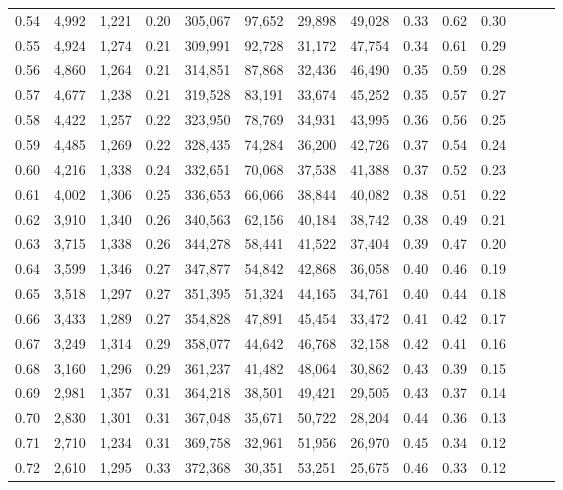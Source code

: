 \begin{tabular}{rrrrrrrrrrrrrr}
0.54 &  4,992 &  1,221 &  0.20 &  305,067 &   97,652 &  29,898 &  49,028 &  0.33 &  0.62 &      0.30 \\
0.55 &  4,924 &  1,274 &  0.21 &  309,991 &   92,728 &  31,172 &  47,754 &  0.34 &  0.61 &      0.29 \\
0.56 &  4,860 &  1,264 &  0.21 &  314,851 &   87,868 &  32,436 &  46,490 &  0.35 &  0.59 &      0.28 \\
0.57 &  4,677 &  1,238 &  0.21 &  319,528 &   83,191 &  33,674 &  45,252 &  0.35 &  0.57 &      0.27 \\
0.58 &  4,422 &  1,257 &  0.22 &  323,950 &   78,769 &  34,931 &  43,995 &  0.36 &  0.56 &      0.25 \\
0.59 &  4,485 &  1,269 &  0.22 &  328,435 &   74,284 &  36,200 &  42,726 &  0.37 &  0.54 &      0.24 \\
0.60 &  4,216 &  1,338 &  0.24 &  332,651 &   70,068 &  37,538 &  41,388 &  0.37 &  0.52 &      0.23 \\
0.61 &  4,002 &  1,306 &  0.25 &  336,653 &   66,066 &  38,844 &  40,082 &  0.38 &  0.51 &      0.22 \\
0.62 &  3,910 &  1,340 &  0.26 &  340,563 &   62,156 &  40,184 &  38,742 &  0.38 &  0.49 &      0.21 \\
0.63 &  3,715 &  1,338 &  0.26 &  344,278 &   58,441 &  41,522 &  37,404 &  0.39 &  0.47 &      0.20 \\
0.64 &  3,599 &  1,346 &  0.27 &  347,877 &   54,842 &  42,868 &  36,058 &  0.40 &  0.46 &      0.19 \\
0.65 &  3,518 &  1,297 &  0.27 &  351,395 &   51,324 &  44,165 &  34,761 &  0.40 &  0.44 &      0.18 \\
0.66 &  3,433 &  1,289 &  0.27 &  354,828 &   47,891 &  45,454 &  33,472 &  0.41 &  0.42 &      0.17 \\
0.67 &  3,249 &  1,314 &  0.29 &  358,077 &   44,642 &  46,768 &  32,158 &  0.42 &  0.41 &      0.16 \\
0.68 &  3,160 &  1,296 &  0.29 &  361,237 &   41,482 &  48,064 &  30,862 &  0.43 &  0.39 &      0.15 \\
0.69 &  2,981 &  1,357 &  0.31 &  364,218 &   38,501 &  49,421 &  29,505 &  0.43 &  0.37 &      0.14 \\
0.70 &  2,830 &  1,301 &  0.31 &  367,048 &   35,671 &  50,722 &  28,204 &  0.44 &  0.36 &      0.13 \\
0.71 &  2,710 &  1,234 &  0.31 &  369,758 &   32,961 &  51,956 &  26,970 &  0.45 &  0.34 &      0.12 \\
0.72 &  2,610 &  1,295 &  0.33 &  372,368 &   30,351 &  53,251 &  25,675 &  0.46 &  0.33 &      0.12 \\

\end{tabular}
